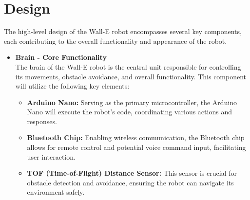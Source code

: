 \documentclass[12pt]{article}
\begin{document}
\section{Design} %
The high-level design of the Wall-E robot encompasses several key components, each contributing to the overall functionality and appearance of the robot.
\begin{itemize}
    \item \textbf{Brain - Core Functionality} \\
    The brain of the Wall-E robot is the central unit responsible for controlling its movements, obstacle avoidance, and overall functionality. This component will utilize the following key elements:
    \begin{itemize}
        \item \textbf{Arduino Nano:} Serving as the primary microcontroller, the Arduino Nano will execute the robot's code, coordinating various actions and responses.
    
        \item \textbf{Bluetooth Chip:} Enabling wireless communication, the Bluetooth chip allows for remote control and potential voice command input, facilitating user interaction.
        
        \item \textbf{TOF (Time-of-Flight) Distance Sensor:} This sensor is crucial for obstacle detection and avoidance, ensuring the robot can navigate its environment safely.
        

\end{itemize}
\end{itemize}
\end{document}
